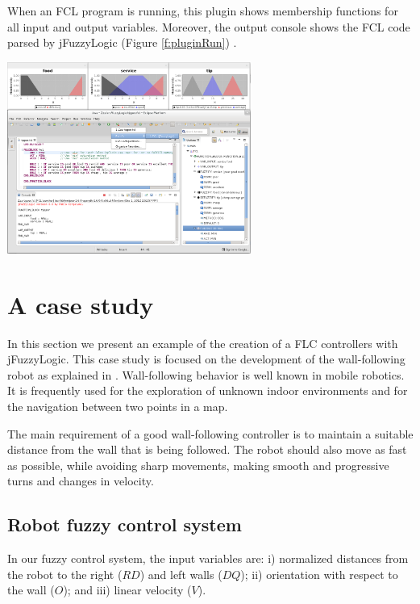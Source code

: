 \documentclass[11pt,twoside]{article}
\begin{document}
\begin{multicols}{2}
When an FCL program is running, this plugin shows membership functions for all input and output variables. Moreover, the output console shows the FCL code parsed by jFuzzyLogic (Figure \ref{f:pluginRun}) .

\vspace*{7pt}
\centerline{\includegraphics[width=3.15in]{./figs/plugin_run}}
\vspace*{3pt}
\label{f:pluginRun}


\section{A case study}
\label{sec:cas}


In this section we present an example of the creation of a FLC controllers with jFuzzyLogic. This case study is focused on the development of the wall-following robot as explained in \cite{Mucientes2010}. Wall-following behavior is well known in mobile robotics. It is frequently used for the exploration of unknown indoor environments and for the navigation between two points in a map. 

The main requirement of a good wall-following controller is to maintain a suitable distance from the wall that is being followed. The robot should also move as fast as possible, while avoiding sharp movements, making smooth and progressive turns and changes in velocity.


\subsection{Robot fuzzy control system \label{sec:casFuz}}

In our fuzzy control system, the input variables are: i) normalized distances from the robot to the right ($RD$) and left walls ($DQ$); ii) orientation with respect to the wall ($O$); and iii) linear velocity ($V$). 


\end{multicols}
\end{document}
